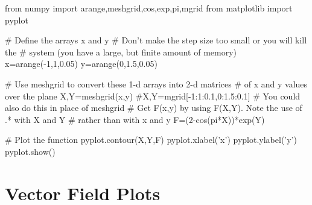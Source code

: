 \begin{codeexample}
\begin{VerbatimOut}{\listingFile}
from numpy import arange,meshgrid,cos,exp,pi,mgrid
from matplotlib import pyplot

# Define the arrays x and y
# Don't make the step size too small or you will kill the
# system (you have a large, but finite amount of memory)
x=arange(-1,1,0.05)
y=arange(0,1.5,0.05)

# Use meshgrid to convert these 1-d arrays into 2-d matrices
# of x and y values over the plane
X,Y=meshgrid(x,y)
#X,Y=mgrid[-1:1:0.1,0:1.5:0.1]  # You could also do this in place of meshgrid
# Get F(x,y) by using F(X,Y). Note the use of .* with X and Y
# rather than with x and y
F=(2-cos(pi*X))*exp(Y)

# Plot the function
pyplot.contour(X,Y,F)
pyplot.xlabel('x')
pyplot.ylabel('y')
pyplot.show()
\end{VerbatimOut}
\end{codeexample}

\section{Vector Field Plots}
 

